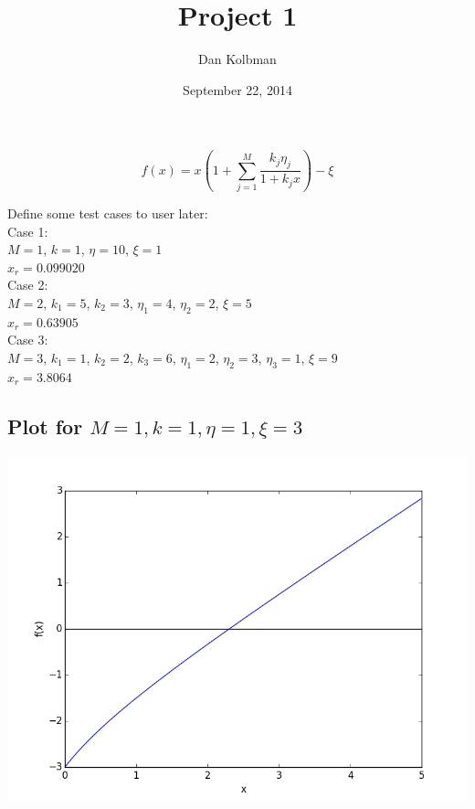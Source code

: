 \documentclass[12pt]{article}
\title{Project 1}
\author{Dan Kolbman}
\date{September 22, 2014}
\begin{document}
  
  \maketitle

  \begin{equation}
    \label{eq:func}
    f(x) = x\left(1+\sum_{j=1}^{M}\frac{k_j\eta_j}{1+k_jx}\right)-\xi
  \end{equation}

  Define some test cases to user later: \\
  Case 1: \\
  $M=1$, $k=1$, $\eta=10$, $\xi=1$\\
  $x_r=0.099020$\\

  Case 2: \\
  $M=2$, $k_1=5$, $k_2=3$, $\eta_1=4$, $\eta_2=2$, $\xi=5$\\
  $x_r=0.63905$\\

  Case 3: \\
  $M=3$, $k_1=1$, $k_2=2$, $k_3=6$, $\eta_1=2$, $\eta_2=3$, $\eta_3=1$, $\xi=9$\\
  $x_r=3.8064$\\

  \subsection*{Plot for $M = 1, k=1, \eta=1, \xi = 3$}

  \includegraphics[scale=0.65]{plot1.png}

  \clearpage
\end{document}
